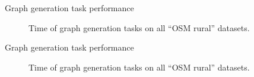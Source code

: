 \documentclass[xcolor={x11names}]{beamer}
\newenvironment{figcenter}
{%
	\parskip=0pt%
	\par%
	\nopagebreak%
	\centering%
}%
{%
	\par%
	\noindent%
	\ignorespacesafterend%
}
\begin{document}
	\begin{frame}{Graph generation task performance}
		\begin{figure}
			\begin{figcenter}
				\hspace*{-0.35cm}
				\scalebox{0.7}
				{
					
				}
			\end{figcenter}
			\caption{Time of graph generation tasks on all \enquote{OSM rural} datasets.}
		\end{figure}
	\end{frame}
	
	\begin{frame}{Graph generation task performance}
		\begin{figure}
			\begin{figcenter}
				\hspace*{-0.35cm}
				\scalebox{0.7}
				{
					
				}
			\end{figcenter}
			\caption{Time of graph generation tasks on all \enquote{OSM rural} datasets.}
		\end{figure}
	\end{frame}
\end{document}
